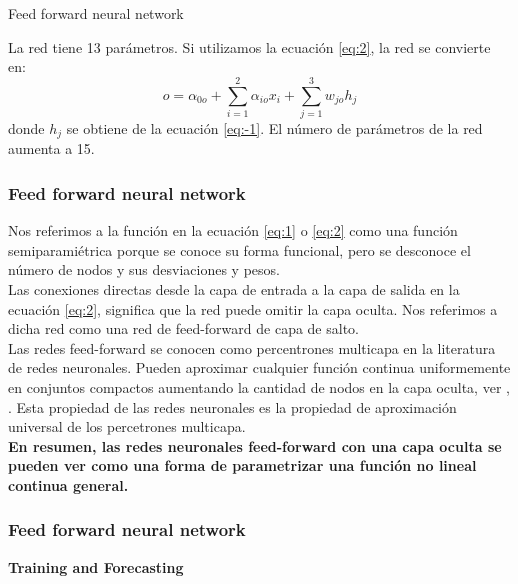 \documentclass[spanish,xcolor=table]{beamer}
\begin{document}
\begin{section}{Feed forward neural network}
\begin{frame}
 La red tiene 13 par\'ametros. Si utilizamos la ecuaci\'on \ref{eq:2},  la red se convierte en:
\begin{equation*} 
o =  \alpha_{0o} + \sum_{i=1}^ {2}  \alpha_{io} x_i  + \sum_{j=1}^ {3} w_{jo} h_j 
\end{equation*}
donde $h_j$ se obtiene de la ecuaci\'on \ref{eq:-1}. El n\'umero de par\'ametros de la red aumenta a 15.
\end{frame}
\begin{frame}
\frametitle{Feed forward neural network}

Nos referimos a la funci\'on en la ecuaci\'on \ref{eq:1} o \ref{eq:2} como una funci\'on semiparami\'etrica porque se conoce su forma funcional, pero se desconoce el n\'umero de nodos y sus desviaciones y pesos.\\
Las conexiones directas desde la capa de entrada a la capa de salida en la ecuaci\'on \ref{eq:2}, significa que la red puede omitir la capa oculta. Nos referimos a dicha red como una red de feed-forward de capa de salto.\\
Las redes feed-forward se conocen como percentrones multicapa en la literatura de redes neuronales. Pueden aproximar cualquier funci\'on continua uniformemente en conjuntos compactos aumentando la cantidad de nodos en la capa oculta, ver \cite{hornik1989multilayer}, \cite{chen1995universal}. Esta propiedad de las redes neuronales es la propiedad de aproximaci\'on universal de los percetrones multicapa. \\
\textbf{En resumen, las redes neuronales feed-forward con una capa oculta se pueden ver como una forma de parametrizar una funci\'on no lineal continua general.}

\end{frame}
\begin{frame}
\frametitle{Feed forward neural network}

\textbf{Training and Forecasting}


\end{frame}
\end{section}
\end{document}

